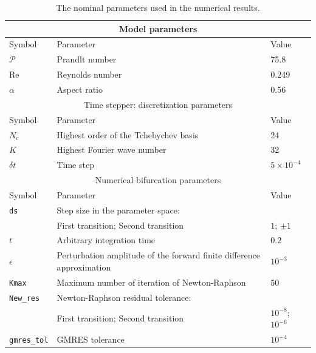 \begin{table}[bth]
\begin{center}
\caption{The nominal parameters used in the numerical results.\label{table_para}} \begin{tabular}{l|p{8cm}|l} \hline\hline\multicolumn{3}{c}{Model parameters}\\
\hline Symbol & Parameter & Value \\ \hline
$\mathcal{P}$ & Prandlt number & 75.8\\
$\mathrm{Re}$ & Reynolds number &  0.249\\
$\alpha$ & Aspect ratio &  0.56\\ \hline
\multicolumn{3}{c}{Time stepper: discretization parameters}\\ \hline
 Symbol & Parameter & Value \\ \hline
 $N_c$ &  Highest order of the Tchebychev basis & 24\\
 $K$  & Highest Fourier wave number & 32 \\
$\delta t$ &   Time step  & $5\times10^{-4}$\\
\hline \multicolumn{3}{c}{Numerical bifurcation parameters}\\ \hline
 Symbol & Parameter & Value \\ \hline
 \texttt{ds}  & Step size in the parameter space: & \\
	& First transition; Second transition & $1$; $\pm 1$\\
$t$ & Arbitrary integration time  & $0.2$ \\
 $\epsilon$ & Perturbation amplitude of the forward finite difference approximation &  $10^{-3}$\\
\texttt{Kmax} & Maximum number of iteration of Newton-Raphson   & $50$\\
\texttt{New\_res}& Newton-Raphson residual tolerance:  & \\
	& First transition; Second transition & $10^{-8}$; $10^{-6}$\\
\texttt{gmres\_tol} & GMRES tolerance & $10^{-4}$\\ \hline\hline
 \end{tabular} \end{center} \end{table}


